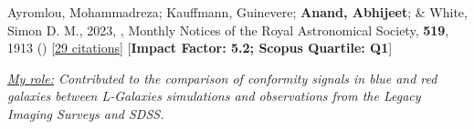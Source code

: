 \item[{\color{numcolor}\scriptsize1}] Ayromlou, Mohammadreza; Kauffmann, Guinevere; \textbf{Anand, Abhijeet}; \& White, Simon D. M., 2023, , Monthly Notices of the Royal Astronomical Society, \textbf{519}, 1913 () [\href{https://ui.adsabs.harvard.edu/abs/2023MNRAS.519.1913A}{29 citations}] [\textbf{Impact Factor: 5.2; Scopus Quartile: Q1}]

\vspace{1mm}
\item\textit{\underline{My role:} Contributed to the comparison of conformity signals in blue and red galaxies between L-Galaxies simulations and observations from the Legacy Imaging Surveys and SDSS.}
\vspace{1mm}
